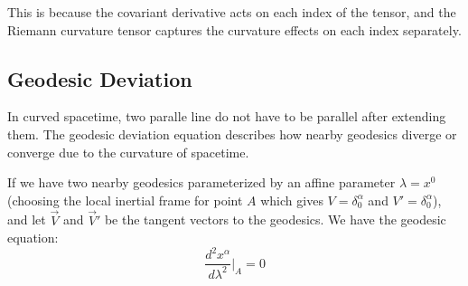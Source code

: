 \documentclass{article}
\begin{document}
This is because the covariant derivative acts on each index of the tensor, and the Riemann curvature tensor captures the curvature effects on each index separately.

\subsection{Geodesic Deviation}

In curved spacetime, two paralle line do not have to be parallel after extending them. The geodesic deviation equation describes how nearby geodesics diverge or converge due to the curvature of spacetime.

\begin{center}
\end{center}

If we have two nearby geodesics parameterized by an affine parameter $\lambda=x^0$ (choosing the local inertial frame for point $A$ which gives $V=\delta^\alpha_0$ and $V'=\delta^\alpha_0$), and let $\vec V$ and $\vec V'$ be the tangent vectors to the geodesics. We have the geodesic equation:
\begin{equation}
    \frac{d^2x^\alpha}{d\lambda^2}\Big|_A=0
\end{equation}
\end{document}
